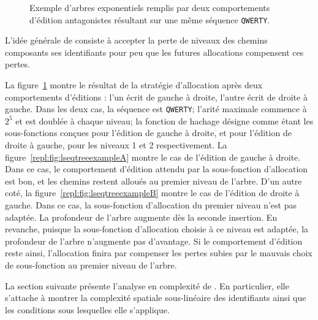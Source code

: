\begin{figure}
  \begin{center}
    \caption[Gestion des comportements d'édition par \LSEQ]
    {\label{repl:fig:lseqtreeexample} Exemple d'arbres exponentiels \LSEQ
      remplis par deux comportements d'édition antagonistes résultant sur une
      même séquence \texttt{QWERTY}.}
  \end{center}
\end{figure}

L'idée générale de \LSEQ consiste à accepter la perte de niveaux des chemins
composants ses identifiants pour peu que les futures allocations compensent ces
pertes.


La figure~\ref{repl:fig:lseqtreeexample} montre le résultat de la stratégie
d'allocation \LSEQ après deux comportements d'éditions : l'un écrit de gauche à
droite, l'autre écrit de droite à gauche. Dans les deux cas, la séquence est
\texttt{QWERTY}; l'arité maximale commence à $2^5$ et est doublée à chaque
niveau; la fonction de hachage désigne comme étant les sous-fonctions conçues
pour l'édition de gauche à droite, et pour l'édition de droite à gauche, pour
les niveaux 1 et 2 respectivement. La figure~\ref{repl:fig:lseqtreeexampleA}
montre le cas de l'édition de gauche à droite. Dans ce cas, le comportement
d'édition attendu par la sous-fonction d'allocation est bon, et les chemins
restent alloués au premier niveau de l'arbre. D'un autre coté, la
figure~\ref{repl:fig:lseqtreeexampleB} montre le cas de l'édition de droite à
gauche. Dans ce cas, la sous-fonction d'allocation du premier niveau n'est pas
adaptée. La profondeur de l'arbre augmente dès la seconde insertion. En
revanche, puisque la sous-fonction d'allocation choisie à ce niveau est adaptée,
la profondeur de l'arbre n'augmente pas d'avantage. Si le comportement d'édition
reste ainsi, l'allocation finira par compenser les pertes subies par le mauvais
choix de sous-fonction au premier niveau de l'arbre. 

La section suivante présente l'analyse en complexité de \LSEQ. En particulier,
elle s'attache à montrer la complexité spatiale sous-linéaire des identifiants
ainsi que les conditions sous lesquelles elle s'applique.

